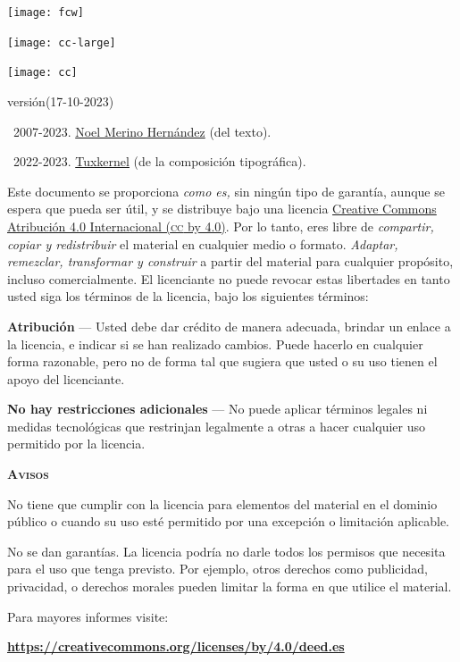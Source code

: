 \documentclass[14pt,twoside,final]{extbook} %
\providecommand\phantomsection{} %
\begin{document}
\newpage
\pagestyle{empty}
\vspace*{0pt}
\vfill
\begin{scriptsize}
\begin{flushleft}
\begin{minipage}{7.5cm}
\texttt{[image: fcw]}\phantomsection\label{fig:free-cultural} \protect\medskip

\texttt{[image: cc-large]}\phantomsection\label{fig:cc-large} \protect\medskip

\texttt{[image: cc]}\phantomsection\label{fig:cc} \protect\medskip

\def\fileversion{1.034}
\def\filedate{(17-10-2023)}
versión\space\fileversion\space\filedate \protect\medskip

\textcopyright\ 2007-2023. \href{noel_merino@yahoo.com.mx}{Noel Merino Hernández} (del texto).

\textcopyright\ 2022-2023. \href{muxkernel@gmail.com}{Tuxkernel} (de la composición tipográfica). \protect\medskip

Este documento se proporciona \emph{como es,} sin ningún tipo de garantía, aunque se espera que pueda ser útil, y se distribuye bajo una licencia \href{https://creativecommons.org/licenses/by/4.0/deed.es}{Creative Commons Atribución 4.0 Internacional (\textsc{cc} by 4.0)}. Por lo tanto, eres libre de \emph{compartir, copiar y redistribuir} el material en cualquier medio o formato. \emph{Adaptar, remezclar, transformar y construir} a partir del material para cualquier propósito, incluso comercialmente. El licenciante no puede revocar estas libertades en tanto usted siga los términos de la licencia, bajo los siguientes términos: \protect\medskip

\textbf{Atribución} --- Usted debe dar crédito de manera adecuada, brindar un enlace a la licencia, e indicar si se han realizado cambios. Puede hacerlo en cualquier forma razonable, pero no de forma tal que sugiera que usted o su uso tienen el apoyo del licenciante. \protect\medskip

\textbf{No hay restricciones adicionales} --- No puede aplicar términos legales ni medidas tecnológicas que restrinjan legalmente a otras a hacer cualquier uso permitido por la licencia. \protect\medskip

\textbf{\textsc{Avisos}} \protect\medskip

No tiene que cumplir con la licencia para elementos del material en el dominio público o cuando su uso esté permitido por una excepción o limitación aplicable. \protect\medskip

No se dan garantías. La licencia podría no darle todos los permisos que necesita para el uso que tenga previsto. Por ejemplo, otros derechos como publicidad, privacidad, o derechos morales pueden limitar la forma en que utilice el material. \protect\medskip

Para mayores informes visite: \protect\medskip

\textbf{\url{https://creativecommons.org/licenses/by/4.0/deed.es}}
\end{minipage}
\end{flushleft}
\end{scriptsize}
\end{document}

